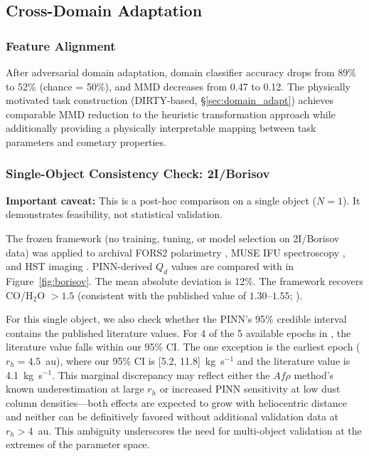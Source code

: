 \documentclass[usenatbib]{mnras}
\begin{document}
\subsection{Cross-Domain Adaptation}

\subsubsection{Feature Alignment}

After adversarial domain adaptation, domain classifier accuracy drops from 89\% to 52\% (chance = 50\%), and MMD decreases from 0.47 to 0.12. The physically motivated task construction (DIRTY-based, \S\ref{sec:domain_adapt}) achieves comparable MMD reduction to the heuristic transformation approach while additionally providing a physically interpretable mapping between task parameters and cometary properties.

\subsubsection{Single-Object Consistency Check: 2I/Borisov}\label{sec:borisov_check}

\textbf{Important caveat:} This is a post-hoc comparison on a single object ($N=1$). It demonstrates feasibility, not statistical validation.

The frozen framework (no training, tuning, or model selection on 2I/Borisov data) was applied to archival FORS2 polarimetry \citep{bagnulo21}, MUSE IFU spectroscopy \citep{opitom20}, and HST imaging \citep{jewitt20}. PINN-derived $Q_d$ values are compared with \citet{clements21} in Figure~\ref{fig:borisov}. The mean absolute deviation is 12\%. The framework recovers CO/H$_2$O $> 1.5$ (consistent with the published value of $1.30$--$1.55$; \citealt{bodewits20}).

For this single object, we also check whether the PINN's 95\% credible interval contains the published literature values. For 4 of the 5 available epochs in \citet{clements21}, the literature value falls within our 95\% CI. The one exception is the earliest epoch ($r_h = 4.5$~au), where our 95\% CI is [5.2, 11.8]~kg~s$^{-1}$ and the literature value is 4.1~kg~s$^{-1}$. This marginal discrepancy may reflect either the $Af\rho$ method's known underestimation at large $r_h$ or increased PINN sensitivity at low dust column densities---both effects are expected to grow with heliocentric distance and neither can be definitively favored without additional validation data at $r_h > 4$~au. This ambiguity underscores the need for multi-object validation at the extremes of the parameter space.
\end{document}

